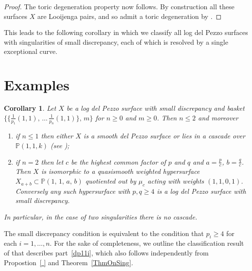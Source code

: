 \documentclass[12pt]{amsbook}
\theoremstyle{plain}
\newtheorem{cor}[thm]{Corollary}
\newcommand{\mb}[1]{\mathbb{#1}}
\newcommand{\LJ}{Looijenga pair}
\renewcommand{\P}{\mathbb{P}}
\begin{document}
\begin{proof}
The toric degeneration property now follows. By construction all these surfaces $X$ are \LJ s,
and so admit a toric degeneration by \cite[Theorem ??]{GHK}.
\end{proof}


This leads to the following corollary in which we classify all log del Pezzo surfaces with singularities of small discrepancy, each of which is resolved by a single exceptional curve.
 
\section{Examples}
 
\begin{cor}
Let $X$ be a log del Pezzo surface with small discrepancy and
basket  $\{ \{ \frac{1}{p_1}(1,1), \, \dots \, \frac{1}{p_n}(1,1) \}, \, m \}$
for $n\ge0$ and $m\ge0$. Then $n\le2$ and moreover
\begin{enumerate}
\item\label{dp11i}
if $n\le1$ then either $X$ is a smooth del Pezzo surface or 
lies in a cascade over $\P(1,1,k)$ (see \cite[Table ??]{CP});
\item\label{dp11ii}
if $n=2$ then let $c$ be the highest common factor of $p$ and $q$ and $a = \frac{p}{c}$, $b = \frac{q}{c}$. Then $X$
is isomorphic to a quasismooth weighted hypersurface
$X_{a+b}\subset \mb{P}(1,\,1,\,a,\,b)$ quotiented out by $\mu_c$ acting with weights $(1,1,0,1)$. Conversely any such hypersurface with $p,q\ge4$ is
a log del Pezzo surface with small discrepancy.
\end{enumerate}
In particular, in the case of two singularities there is no cascade.
\end{cor}

The small discrepancy condition is equivalent to the condition that
$p_i \geq 4$ for each $i=1,\dots,n$. 
For the sake of completeness, we outline the classification result of \cite{CP} that
describes part~\ref{dp11i}, which also follows independently from Propostion~\ref{ } and Theorem~\ref{ThmOnSing}.
\end{document}
